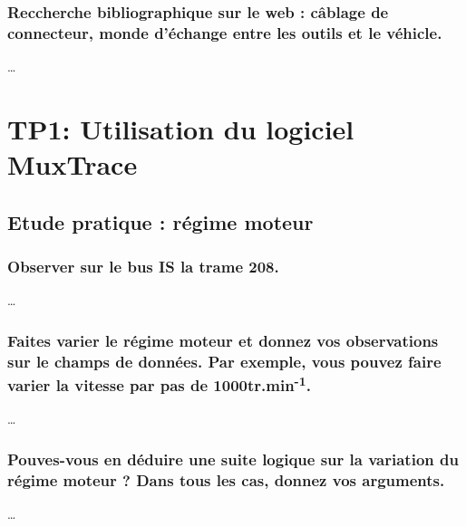 \documentclass{rapportECC}
\begin{document}
\subsubsection*{Reccherche bibliographique sur le web : câblage de connecteur, monde d'échange entre les outils et le véhicle.}

\dots


\section{TP1: Utilisation du logiciel MuxTrace}


\subsection{Etude pratique : régime moteur}

\subsubsection*{Observer sur le bus IS la trame 208.}

\dots

\subsubsection*{Faites varier le régime moteur et donnez vos observations sur le champs de données. Par exemple, vous pouvez faire varier la vitesse par pas de 1000tr.min\textsuperscript{-1}.}

\dots

\subsubsection*{Pouves-vous en déduire une suite logique sur la variation du régime moteur ? Dans tous les cas, donnez vos arguments.}

\dots

\end{document}
